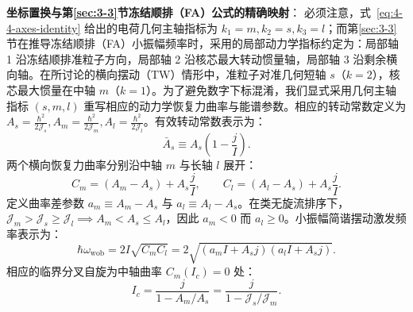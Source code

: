 \textbf{坐标置换与第\ref{sec:3-3}节冻结顺排（FA）公式的精确映射}：
必须注意，式~\eqref{eq:4-4-axes-identity} 给出的电荷几何主轴指标为 $k_1 = m, k_2 = s, k_3 = l$；而第\ref{sec:3-3}节在推导冻结顺排（FA）小振幅频率时，采用的局部动力学指标约定为：局部轴 1 沿冻结顺排准粒子方向，局部轴 2 沿核芯最大转动惯量轴，局部轴 3 沿剩余横向轴。在所讨论的横向摆动（TW）情形中，准粒子对准几何短轴 $s$（$k=2$），核芯最大惯量在中轴 $m$（$k=1$）。为了避免数字下标混淆，我们显式采用几何主轴指标 $(s, m, l)$ 重写相应的动力学恢复力曲率与能谱参数。相应的转动常数定义为 $A_s = \frac{\hbar^2}{2\mathcal{J}_s}, A_m = \frac{\hbar^2}{2\mathcal{J}_m}, A_l = \frac{\hbar^2}{2\mathcal{J}_l}$。有效转动常数表示为：
\begin{equation}\label{eq:4-4-A-s-bar}
\bar{A}_s \equiv A_s \left( 1 - \frac{j}{I} \right).
\end{equation}
两个横向恢复力曲率分别沿中轴 $m$ 与长轴 $l$ 展开：
\begin{equation}\label{eq:4-4-curvatures-sml}
C_m = (A_m - A_s) + A_s \frac{j}{I}, \qquad C_l = (A_l - A_s) + A_s \frac{j}{I}.
\end{equation}
定义曲率差参数 $a_m \equiv A_m - A_s$ 与 $a_l \equiv A_l - A_s$。在类无旋流排序下，$\mathcal{J}_m > \mathcal{J}_s \ge \mathcal{J}_l \implies A_m < A_s \le A_l$，因此 $a_m < 0$ 而 $a_l \ge 0$。小振幅简谐摆动激发频率表示为：
\begin{equation}\label{eq:4-4-wob-freq-sml}
\hbar\omega_{\text{wob}} = 2I\sqrt{C_m C_l} = 2\sqrt{\left( a_m I + A_s j \right) \left( a_l I + A_s j \right)}.
\end{equation}
相应的临界分叉自旋为中轴曲率 $C_m(I_c) = 0$ 处：
\begin{equation}\label{eq:4-4-critical-spin-sml}
I_c = \frac{j}{1 - A_m / A_s} = \frac{j}{1 - \mathcal{J}_s / \mathcal{J}_m}.
\end{equation}

